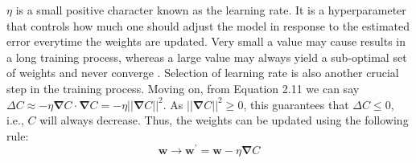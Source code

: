 $\eta$ is a small positive character known as the learning rate. It is a hyperparameter that controls how much one should adjust the model in response to the estimated error everytime the weights are updated. Very small a value may cause results in a long training process, whereas a large value may always yield a sub-optimal set of weights and never converge \cite{learningrate}. Selection of learning rate is also another crucial step in the training process. Moving on, from Equation 2.11 we can say $\Delta C \approx -\eta\boldsymbol\nabla C\cdot \boldsymbol\nabla C = -\eta||\boldsymbol\nabla C||^2$. As $||\boldsymbol\nabla C||^2 \geq 0$, this guarantees that $\Delta C \leq 0$, i.e., $C$ will always decrease. Thus, the weights can be updated using the following rule:
\begin{equation}
\boldsymbol w \rightarrow \boldsymbol w^{'} = \boldsymbol w - \eta\boldsymbol\nabla C
\end{equation} 

